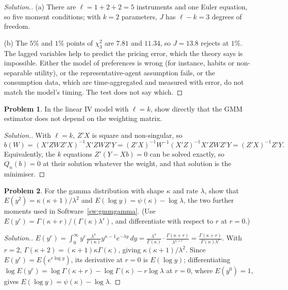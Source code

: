 \documentclass[11pt,a4paper]{article}
\numberwithin{equation}{section}
\theoremstyle{definition}
\newtheorem{problemx}{Problem}[subsection]
\newenvironment{problem}{\begin{problemx}}{\end{problemx}}
\newenvironment{solution}
  {\renewcommand{\qedsymbol}{}\begin{proof}[\textit{Solution}.]}
  {\end{proof}}
\begin{document}
\begin{solution}
(a) There are $\ell = 1 + 2 + 2 = 5$ instruments and one Euler equation, so five moment conditions; with $k = 2$ parameters, $J$ has $\ell - k = 3$ degrees of freedom.

(b) The $5\%$ and $1\%$ points of $\chi^2_3$ are $7.81$ and $11.34$, so $J = 13.8$ rejects at $1\%$. The lagged variables help to predict the pricing error, which the theory says is
impossible. Either the model of preferences is wrong (for instance, habits or non-separable utility), or the representative-agent assumption fails, or
the consumption data, which are time-aggregated and measured with error, do not match the model's timing. The test does not say which.
\end{solution}

\begin{problem}
In the linear IV model with $\ell = k$, show directly that the GMM estimator does not depend on the weighting matrix.
\end{problem}

\begin{solution}
With $\ell = k$, $Z'X$ is square and non-singular, so
\[
b(W) = (X'ZWZ'X)^{-1}X'ZWZ'Y = (Z'X)^{-1}W^{-1}(X'Z)^{-1}X'ZWZ'Y = (Z'X)^{-1}Z'Y .
\]
Equivalently, the $k$ equations $Z'(Y - Xb) = 0$ can be solved exactly, so $Q_n(b) = 0$ at their solution whatever the weight, and that solution is the minimiser.
\end{solution}

\begin{problem}
For the gamma distribution with shape $\kappa$ and rate $\lambda$, show that $E(y^2) = \kappa(\kappa + 1)/\lambda^2$ and $E(\log y) = \psi(\kappa) - \log\lambda$, the two further moments used in
Software~\ref{sw:gmmgamma}. (Use $E(y^r) = \Gamma(\kappa + r)/(\Gamma(\kappa)\lambda^r)$, and differentiate with respect to $r$ at $r = 0$.)
\end{problem}

\begin{solution}
$E(y^r) = \int_0^\infty y^r\frac{\lambda^\kappa}{\Gamma(\kappa)}y^{\kappa - 1}e^{-\lambda y}\,dy = \frac{\lambda^\kappa}{\Gamma(\kappa)}\cdot\frac{\Gamma(\kappa + r)}{\lambda^{\kappa + r}} = \frac{\Gamma(\kappa + r)}{\Gamma(\kappa)\lambda^r}$. With $r = 2$, $\Gamma(\kappa + 2) = (\kappa + 1)\kappa\Gamma(\kappa)$, giving
$\kappa(\kappa + 1)/\lambda^2$. Since $E(y^r) = E(e^{r\log y})$, its derivative at $r = 0$ is $E(\log y)$; differentiating $\log E(y^r) = \log\Gamma(\kappa + r) - \log\Gamma(\kappa) - r\log\lambda$ at $r = 0$, where
$E(y^0) = 1$, gives $E(\log y) = \psi(\kappa) - \log\lambda$.
\end{solution}
\end{document}

